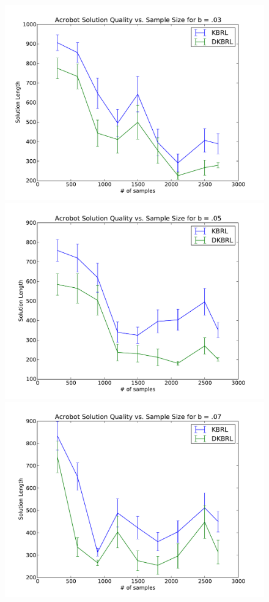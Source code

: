 \begin{figure}[!htb]
    \includegraphics[width=\linewidth]{figs/chap5/acr03.pdf}
  \endminipage\hfill
    \includegraphics[width=\linewidth]{figs/chap5/acr05.pdf}
  \endminipage\hfill
    \includegraphics[width=\linewidth]{figs/chap5/acr07.pdf}

\end{figure}
